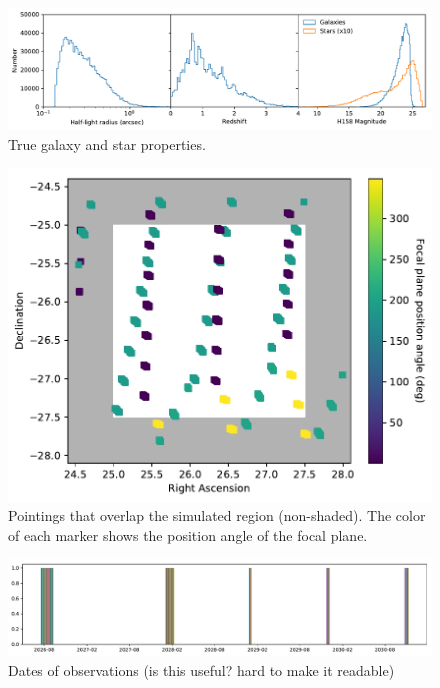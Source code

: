 \documentclass[aps,prd, amsmath,amssymb,superscriptaddress,showkeys,nofootinbib,reprint,preprintnumbers]{revtex4-1}
\begin{document}
\begin{figure}
\begin{center}
\includegraphics[width=\textwidth]{figures/hist.pdf}
\end{center}
\caption[]{
True galaxy and star properties.
\label{fig:hist}}
\end{figure}

\begin{figure}
\begin{center}
\includegraphics[width=\columnwidth]{figures/pointings.pdf}
\end{center}
\caption[]{
Pointings that overlap the simulated region (non-shaded). The color of each marker shows the position angle of the focal plane.
\label{fig:pointings}}
\end{figure}

\begin{figure}
\begin{center}
\includegraphics[width=\textwidth]{figures/dates.pdf}
\end{center}
\caption[]{
Dates of observations (is this useful? hard to make it readable)
\label{fig:dates}}
\end{figure}
\end{document}
